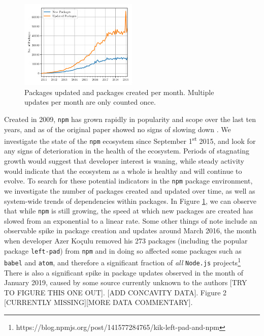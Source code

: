\documentclass[10pt,conference]{IEEEtran}
\def\code#1{\texttt{#1}}
\begin{document}
\begin{figure}
  \includegraphics[width=0.5\textwidth]{figures/new_vs_updates_by_month.pdf}
  \caption{Packages updated and packages created per month. Multiple updates per month are
  only counted once.}
  \label{npmGrowth}
\end{figure}

Created in 2009, \code{npm} has grown
rapidly in popularity and scope over the last ten years, and 
as of the original paper showed no signs of slowing down \cite{Wittern:2016}.
We investigate the state of the \code{npm} ecosystem
since September 1\textsuperscript{st} 2015, and look for any signs of deterioration in 
the health of the ecosystem. Periods of stagnating growth would suggest
that developer interest is waning, while steady activity would 
indicate that the ecosystem as a whole is healthy and will continue to
evolve. To search for these potential indicators in the \code{npm} package environment,
we investigate the number of packages created and updated over time, as well
as system-wide trends of dependencies within packages. In Figure \ref{npmGrowth},
we can observe that while \code{npm} is still growing, the speed at which new packages
are created has slowed from an exponential to a linear rate. Some other things of note 
include an observable spike in package creation and updates around March 2016, the month 
when developer Azer Koçulu removed his 273 packages (including the popular package 
\code{left-pad}) from \code{npm} and in doing so affected some packages such as 
\code{babel} and \code{atom}, and therefore a significant fraction of \emph{all} 
\code{Node.js} projects\footnote{https://blog.npmjs.org/post/141577284765/kik-left-pad-and-npm}
There is also a significant spike in package updates observed in the month of January 2019, caused 
by some source currently unknown to the authors [TRY TO FIGURE THIS ONE OUT].
[ADD CONCAVITY DATA]. Figure 2 [CURRENTLY MISSING][MORE DATA COMMENTARY].
\end{document}
